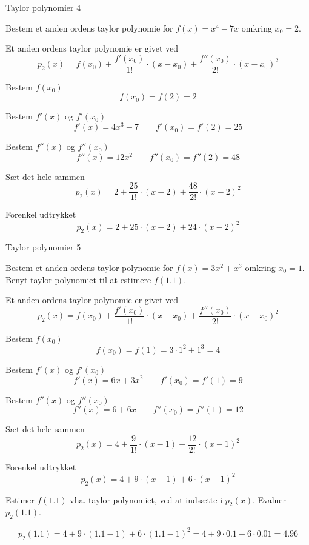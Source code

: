 \documentclass{article}
\begin{document}
\begin{exercise}{Taylor polynomier 4}

Bestem et anden ordens taylor polynomie for $f(x) = x^4 - 7x$
omkring $x_0 = 2$.


\hint
Et anden ordens taylor polynomie
er givet ved
\[
p_2(x) = f(x_0) + \frac{f'(x_0)}{1!} \cdot (x - x_0)
 + \frac{f''(x_0)}{2!} \cdot (x - x_0)^2
\]


\hint
Bestem $f(x_0)$
\[
f(x_0) = f(2) = 2
\]

\hint
Bestem $f'(x)$ og $f'(x_0)$
\[
f'(x) = 4x^3 - 7 \qquad f'(x_0) = f'(2) = 25
\]

\hint
Bestem $f''(x)$ og $f''(x_0)$
\[
f''(x) = 12 x^2 \qquad f''(x_0) = f''(2) = 48
\]

\hint
Sæt det hele sammen
\[
p_2(x) = 2 + \frac{25}{1!} \cdot \left(x - 2\right) + \frac{48}{2!} \cdot \left(x - 2\right)^2
\]

\hint
Forenkel udtrykket
\[
p_2(x) = 2 + 25 \cdot \left(x - 2\right) + 24 \cdot \left(x - 2\right)^2
\]


\end{exercise}


\begin{exercise}{Taylor polynomier 5}

Bestem et anden ordens taylor polynomie for $f(x) = 3 x^2 + x^3$
omkring $x_0 = 1$.
Benyt taylor polynomiet til at estimere $f(1.1)$.


\hint
Et anden ordens taylor polynomie
er givet ved
\[
p_2(x) = f(x_0) + \frac{f'(x_0)}{1!} \cdot (x - x_0)
 + \frac{f''(x_0)}{2!} \cdot (x - x_0)^2
\]


\hint
Bestem $f(x_0)$
\[
f(x_0) = f(1) = 3 \cdot 1^2 + 1^3 = 4
\]

\hint
Bestem $f'(x)$ og $f'(x_0)$
\[
f'(x) = 6 x + 3 x^2 \qquad f'(x_0) = f'(1) = 9
\]

\hint
Bestem $f''(x)$ og $f''(x_0)$
\[
f''(x) = 6 + 6x \qquad f''(x_0) = f''(1) = 12
\]

\hint
Sæt det hele sammen
\[
p_2(x) = 4 + \frac{9}{1!} \cdot \left(x - 1\right) + \frac{12}{2!} \cdot \left(x - 1\right)^2
\]

\hint
Forenkel udtrykket
\[
p_2(x) = 4 + 9 \cdot \left(x - 1\right) + 6 \cdot \left(x - 1\right)^2
\]

\hint
Estimer $f(1.1)$ vha. taylor polynomiet, ved at indsætte i $p_2(x)$.
Evaluer $p_2(1.1)$.

\hint
\[
p_2(1.1) = 4 + 9 \cdot \left(1.1 - 1\right) + 6 \cdot \left(1.1 - 1\right)^2
 = 4 + 9 \cdot 0.1 + 6 \cdot 0.01 = 4.96
\]



\end{exercise}
\end{document}
